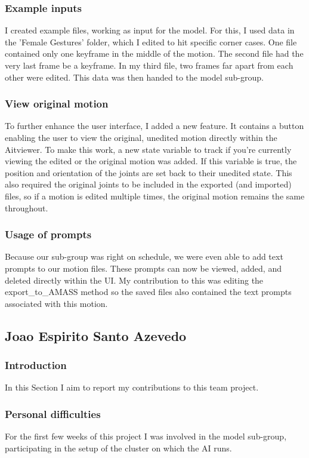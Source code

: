 \documentclass[a4paper]{scrartcl}
\begin{document}
\subsubsection*{Example inputs}
I created example files, working as input for the model. For this, I used data in the 'Female Gestures' folder, which I edited to hit specific corner cases. One file contained only one keyframe in the middle of the motion. The second file had the very last frame be a keyframe. In my third file, two frames far apart from each other were edited. This data was then handed to the model sub-group.

\subsubsection*{View original motion}
To further enhance the user interface, I added a new feature. It contains a button enabling the user to view the original, unedited motion directly within the Aitviewer. To make this work, a new state variable to track if you're currently viewing the edited or the original motion was added. If this variable is true, the position and orientation of the joints are set back to their unedited state. This also required the original joints to be included in the exported (and imported) files, so if a motion is edited multiple times, the original motion remains the same throughout.

\subsubsection*{Usage of prompts}
Because our sub-group was right on schedule, we were even able to add text prompts to our motion files. These prompts can now be viewed, added, and deleted directly within the UI. My contribution to this was editing the export\_to\_AMASS method so the saved files also contained the text prompts associated with this motion.

\subsection*{Joao Espirito Santo Azevedo}
\subsubsection*{Introduction}
In this Section I aim to report my contributions to this team project.\\

\subsubsection*{Personal difficulties}
For the first few weeks of this project I was involved in the model sub-group, participating in the setup of the cluster on which the AI runs.\\
\end{document}
